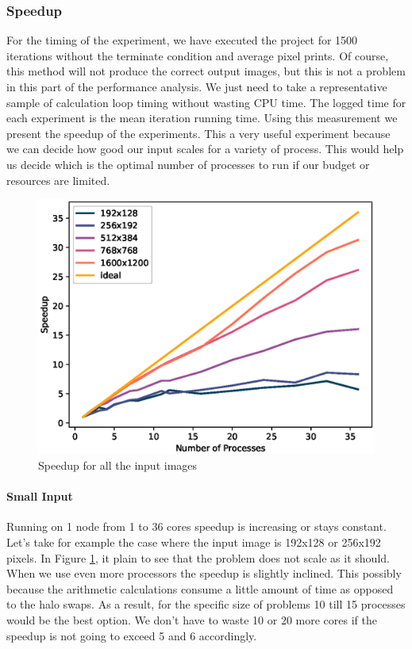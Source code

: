 \documentclass[12pt,a4paper]{article}
\begin{document}
        \subsubsection{Speedup}
          For the timing of the experiment, we have executed the project for 1500 iterations without the terminate condition and average pixel prints. Of course, this method will not produce the correct output images, but this is not a problem in this part of the performance analysis. We just need to take a representative sample of calculation loop timing without wasting CPU time. The logged time for each experiment is the mean iteration running time. Using this measurement we present the speedup of the experiments. This a very useful experiment because we can decide how good our input scales for a variety of process. This would help us decide which is the optimal number of processes to run if our budget or resources are limited.

          \begin{figure}[ht]
            \centering
            \includegraphics[scale=0.8]{../graphs/speedup.eps}
            \caption{Speedup for all the input images}
            \label{speedup}
          \end{figure}

          \paragraph{Small Input}
            Running on 1 node from 1 to 36 cores speedup is increasing or stays constant. Let's take for example the case where the input image is 192x128 or 256x192 pixels. In Figure \ref{speedup}, it plain to see that the problem does not scale as it should. When we use even more processors the speedup is slightly inclined. This possibly because the arithmetic calculations consume a little amount of time as opposed to the halo swaps. As a result, for the specific size of problems 10 till 15 processes would be the best option. We don't have to waste 10 or 20 more cores if the speedup is not going to exceed 5 and 6 accordingly.
\end{document}

